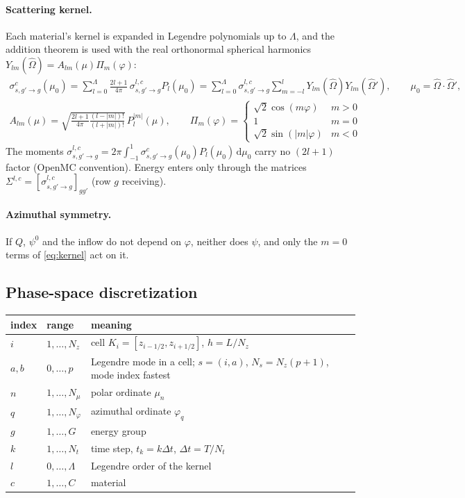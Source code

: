 \documentclass[11pt,a4paper]{article}
\newcommand{\Om}{\hat{\Omega}}
\newcommand{\dd}{\mathrm{d}}
\newcommand{\Lmax}{\Lambda}
\begin{document}
\paragraph{Scattering kernel.} Each material's kernel is expanded in Legendre polynomials up to $\Lmax$, and the addition theorem is used with the real orthonormal spherical harmonics $Y_{lm}(\Om)=A_{lm}(\mu)\Pi_m(\varphi)$:
\begin{gather}
\sigma^c_{s,g'\to g}(\mu_0)=\sum_{l=0}^{\Lmax}\frac{2l+1}{4\pi}\,\sigma^{l,c}_{s,g'\to g}P_l(\mu_0)
=\sum_{l=0}^{\Lmax}\sigma^{l,c}_{s,g'\to g}\sum_{m=-l}^{l}Y_{lm}(\Om)Y_{lm}(\Om'),\qquad \mu_0=\Om\cdot\Om',
\label{eq:kernel}\\
A_{lm}(\mu)=\sqrt{\tfrac{2l+1}{4\pi}\tfrac{(l-|m|)!}{(l+|m|)!}}\,P_l^{|m|}(\mu),\qquad
\Pi_m(\varphi)=\begin{cases}\sqrt2\cos(m\varphi)&m>0\\1&m=0\\\sqrt2\sin(|m|\varphi)&m<0\end{cases}
\end{gather}
The moments $\sigma^{l,c}_{s,g'\to g}=2\pi\int_{-1}^1\sigma^c_{s,g'\to g}(\mu_0)P_l(\mu_0)\,\dd\mu_0$ carry no $(2l+1)$ factor (OpenMC convention). Energy enters only through the matrices $\Sigma^{l,c}=[\sigma^{l,c}_{s,g'\to g}]_{gg'}$ (row $g$ receiving).

\paragraph{Azimuthal symmetry.} If $Q$, $\psi^0$ and the inflow do not depend on $\varphi$, neither does $\psi$, and only the $m=0$ terms of \eqref{eq:kernel} act on it.

\subsection{Phase-space discretization}
\label{sec:discretization}

\begin{center}\small
\begin{tabular}{@{}lll@{}}
\toprule
index & range & meaning\\
\midrule
$i$ & $1,\dots,N_z$ & cell $K_i=[z_{i-1/2},z_{i+1/2}]$, $h=L/N_z$\\
$a,b$ & $0,\dots,p$ & Legendre mode in a cell; $s=(i,a)$, $N_s=N_z(p+1)$, mode index fastest\\
$n$ & $1,\dots,N_\mu$ & polar ordinate $\mu_n$\\
$q$ & $1,\dots,N_\varphi$ & azimuthal ordinate $\varphi_q$\\
$g$ & $1,\dots,G$ & energy group\\
$k$ & $1,\dots,N_t$ & time step, $t_k=k\Delta t$, $\Delta t=T/N_t$\\
$l$ & $0,\dots,\Lmax$ & Legendre order of the kernel\\
$c$ & $1,\dots,C$ & material\\
\bottomrule
\end{tabular}
\end{center}
\end{document}

